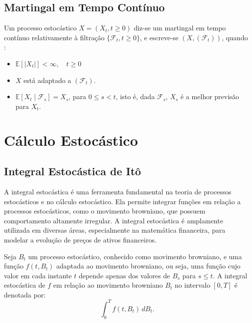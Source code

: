 \documentclass[12pt,openright,oneside,a4paper]{abntex2}
\numberwithin{equation}{section}
\begin{document}
\subsection{Martingal em Tempo Contínuo}

Um processo estocástico $X = (X_t, t \geq 0)$ diz-se um martingal em tempo contínuo relativamente à filtração $\{\mathcal{F}_t, t \geq 0\}$, e escreve-se $(X, (\mathcal{F}_t))$, quando \parencite [p.~80] {Mikosh}:
\begin{itemize}
    \item $\mathbb{E}[|X_t|] < \infty, \quad t \geq 0$
    \item $X$ está adaptado a $(\mathcal{F}_t).$
    \item $\mathbb{E}[X_t \mid \mathcal{F}_s] = X_s$, para $0 \leq s < t$, isto é, dada $\mathcal{F}_s$, $X_s$ é a melhor previsão para $X_t$.
\end{itemize}


\section{Cálculo Estocástico}

\subsection{Integral Estocástica de Itô }

A integral estocástica é uma ferramenta fundamental na teoria de processos estocásticos e no cálculo estocástico. Ela permite integrar funções em relação a processos estocásticos, como o movimento browniano, que possuem comportamento altamente irregular. A integral estocástica é amplamente utilizada em diversas áreas, especialmente na matemática financeira, para modelar a evolução de preços de ativos financeiros.

Seja $B_t$ um processo estocástico, conhecido como movimento browniano, e uma função $f(t, B_t)$ adaptada ao movimento browniano, ou seja, uma função cujo valor em cada instante $t$ depende apenas dos valores de $B_s$ para $s \leq t$. A integral estocástica de $f$ em relação ao movimento browniano $B_t$ no intervalo $[0, T]$ é denotada por:
\begin{equation}
\int_0^T f(t, B_t) \, dB_t.
\end{equation}
\end{document}
